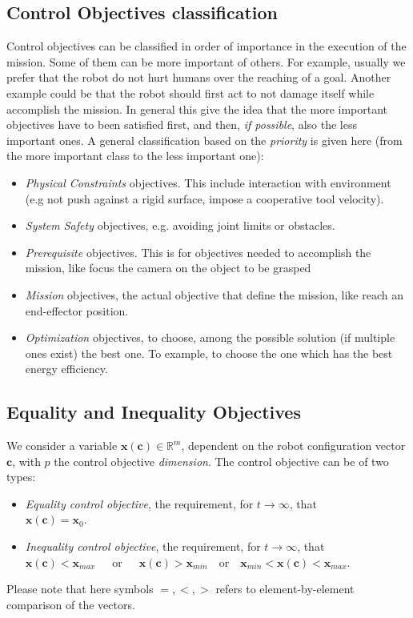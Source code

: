 \subsection{Control Objectives classification}
\label{sec:coClass}
Control objectives can be classified in order of importance in the execution of the mission. Some of them can be more important of others. For example, usually we prefer that the robot do not hurt humans over the reaching of a goal. Another example could be that the robot should first act to not damage itself while accomplish the mission. In general this give the idea that the more important objectives have to been satisfied first, and then, \textit{if possible}, also the less important ones. 
A general classification based on the \textit{priority} is given here (from the more important class to the less important one):
\begin{itemize}
	\item \textit{Physical Constraints} objectives. This include interaction with environment (e.g not push against a rigid surface, impose a cooperative tool velocity).
	\item \textit{System Safety} objectives, e.g. avoiding joint limits or obstacles.
	\item \textit{Prerequisite} objectives. This is for objectives needed to accomplish the mission, like focus the camera on the object to be grasped
	\item \textit{Mission} objectives, the actual objective that define the mission, like reach an end-effector position.
	\item \textit{Optimization} objectives, to choose, among the possible solution (if multiple ones exist) the best one. To example, to choose the one which has the best energy efficiency.  
\end{itemize}

\subsection{Equality and Inequality Objectives}
We consider a variable  $ \boldsymbol{x}(\boldsymbol{c}) \in \mathbb{R}^m $, dependent on the robot configuration vector $ \boldsymbol{c}$, with $ p $ the control objective \textit{dimension}. The control objective can be of two types:
\begin{itemize}
	\item \textit{Equality control objective}, the requirement, for $t \to \infty$, that \\ \mbox{$\boldsymbol{x}(\boldsymbol{c}) = \boldsymbol{x}_0$}.
	
	\item \textit{Inequality control objective}, the requirement, for $t \to \infty$, that \\ \mbox{$\boldsymbol{x}(\boldsymbol{c}) < \boldsymbol{x}_{max}$ ~ or ~ $\boldsymbol{x}(\boldsymbol{c}) > \boldsymbol{x}_{min}$ ~or ~$ \boldsymbol{x}_{min} < \boldsymbol{x}(\boldsymbol{c}) < \boldsymbol{x}_{max}$}.
\end{itemize}
Please note that here symbols $= , < , >$ refers to element-by-element comparison of the vectors.\\

